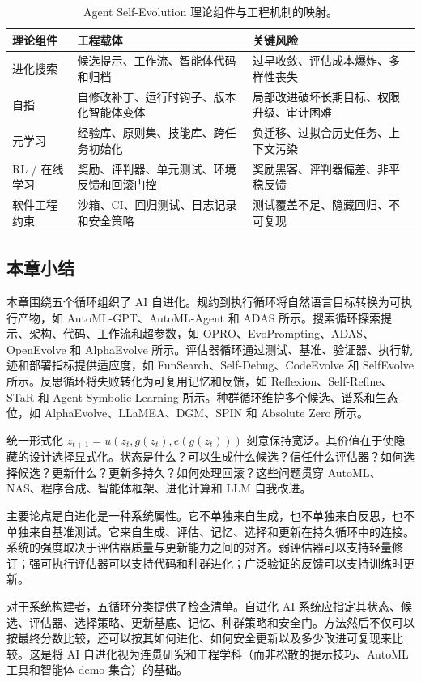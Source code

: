 \begin{table}[htbp]
\centering
\small
\caption{Agent Self-Evolution 理论组件与工程机制的映射。}
\label{tab:ch2-theory-components}
\begin{tabular}{p{}p{}p{}}
\toprule
理论组件 & 工程载体 & 关键风险 \\
\midrule
进化搜索 & 候选提示、工作流、智能体代码和归档 & 过早收敛、评估成本爆炸、多样性丧失 \\
自指 & 自修改补丁、运行时钩子、版本化智能体变体 & 局部改进破坏长期目标、权限升级、审计困难 \\
元学习 & 经验库、原则集、技能库、跨任务初始化 & 负迁移、过拟合历史任务、上下文污染 \\
RL / 在线学习 & 奖励、评判器、单元测试、环境反馈和回滚门控 & 奖励黑客、评判器偏差、非平稳反馈 \\
软件工程约束 & 沙箱、CI、回归测试、日志记录和安全策略 & 测试覆盖不足、隐藏回归、不可复现 \\
\bottomrule
\end{tabular}
\end{table}

\subsection{本章小结}\label{sec:ch2-summary}

本章围绕五个循环组织了 AI 自进化。规约到执行循环将自然语言目标转换为可执行产物，如 AutoML-GPT、AutoML-Agent 和 ADAS 所示。搜索循环探索提示、架构、代码、工作流和超参数，如 OPRO、EvoPrompting、ADAS、OpenEvolve 和 AlphaEvolve 所示。评估器循环通过测试、基准、验证器、执行轨迹和部署指标提供适应度，如 FunSearch、Self-Debug、CodeEvolve 和 SelfEvolve 所示。反思循环将失败转化为可复用记忆和反馈，如 Reflexion、Self-Refine、STaR 和 Agent Symbolic Learning 所示。种群循环维护多个候选、谱系和生态位，如 AlphaEvolve、LLaMEA、DGM、SPIN 和 Absolute Zero 所示。

统一形式化 $z_{t+1}=u(z_t,g(z_t),e(g(z_t)))$ 刻意保持宽泛。其价值在于使隐藏的设计选择显式化。状态是什么？可以生成什么候选？信任什么评估器？如何选择候选？更新什么？更新多持久？如何处理回滚？这些问题贯穿 AutoML、NAS、程序合成、智能体框架、进化计算和 LLM 自我改进。

主要论点是自进化是一种系统属性。它不单独来自生成，也不单独来自反思，也不单独来自基准测试。它来自生成、评估、记忆、选择和更新在持久循环中的连接。系统的强度取决于评估器质量与更新能力之间的对齐。弱评估器可以支持轻量修订；强可执行评估器可以支持代码和种群进化；广泛验证的反馈可以支持训练时更新。

对于系统构建者，五循环分类提供了检查清单。自进化 AI 系统应指定其状态、候选、评估器、选择策略、更新基底、记忆、种群策略和安全门。方法然后不仅可以按最终分数比较，还可以按其如何进化、如何安全更新以及多少改进可复现来比较。这是将 AI 自进化视为连贯研究和工程学科（而非松散的提示技巧、AutoML 工具和智能体 demo 集合）的基础。
